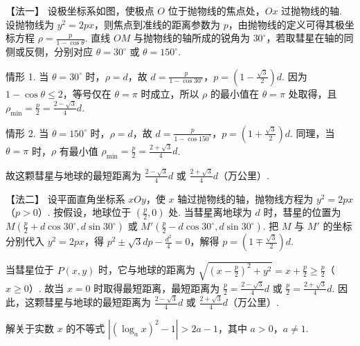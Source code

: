 \begin{solution}
【法一】 设极坐标系如图，使极点 \(O\) 位于抛物线的焦点处，\(Ox\) 过抛物线的轴. 设抛物线为 \(y^2=2px\)，则焦点到准线的距离参数为 \(p\)，由抛物线的定义可得其极坐标方程 \(\rho=\frac{p}{1-\cos\theta}\). 直线 \(OM\) 与抛物线的轴所成的锐角为 \(30^{\circ}\)，若取彗星在轴的同侧或反侧，分别对应 \(\theta=30^{\circ}\) 或 \(\theta=150^{\circ}\).

情形 1. 当 \(\theta = 30^{\circ}\) 时，\(\rho = d\)，故 \(d = \frac{p}{1 - \cos 30^{\circ}}\)，\(p = \left(1 - \frac{\sqrt{3}}{2}\right)d\). 因为 \(1-\cos\theta\leqslant2\)，等号仅在 \(\theta=\pi\) 时成立，所以 \(\rho\) 的最小值在 \(\theta=\pi\) 处取得，且
\(\rho_{\min} = \frac{p}{2} = \frac{2 - \sqrt{3}}{4}d\).

情形 2. 当 \(\theta = 150^{\circ}\) 时，\(\rho = d\)，故 \(d = \frac{p}{1 - \cos 150^{\circ}}\)，\(p = \left(1 + \frac{\sqrt{3}}{2}\right)d\). 同理，当 \(\theta = \pi\) 时，\(\rho\) 有最小值
\(\rho_{\min} = \frac{p}{2} = \frac{2 + \sqrt{3}}{4}d\).

故这颗彗星与地球的最短距离为 \(\frac{2 - \sqrt{3}}{4}d\) 或 \(\frac{2 + \sqrt{3}}{4}d\)（万公里）.

【法二】 设平面直角坐标系 \(xOy\)，使 \(x\) 轴过抛物线的轴，抛物线方程为 \(y^2 = 2px\)（\(p > 0\)）. 按假设，地球位于 \(\left(\frac{p}{2},0\right)\) 处. 当彗星离地球为 \(d\) 时，彗星的位置为 \(M\left(\frac{p}{2} + d\cos 30^{\circ}, d\sin 30^{\circ}\right)\) 或 \(M'\left(\frac{p}{2} - d\cos 30^{\circ}, d\sin 30^{\circ}\right)\). 把 \(M\) 与 \(M'\) 的坐标分别代入 \(y^2 = 2px\)，得 \(p^2 \pm \sqrt{3}dp - \frac{d^2}{4} = 0\)，解得 \(p = \left(1 \mp \frac{\sqrt{3}}{2}\right)d\).

当彗星位于 \(P(x,y)\) 时，它与地球的距离为 \(\sqrt{\left(x - \frac{p}{2}\right)^2 + y^2} = x + \frac{p}{2} \geqslant \frac{p}{2}\)（\(x \geqslant 0\)）. 故当 \(x = 0\) 时取得最短距离，最短距离为 \(\frac{p}{2} = \frac{2 - \sqrt{3}}{4}d\) 或 \(\frac{p}{2} = \frac{2 + \sqrt{3}}{4}d\). 因此，这颗彗星与地球的最短距离为 \(\frac{2 - \sqrt{3}}{4}d\) 或 \(\frac{2 + \sqrt{3}}{4}d\)（万公里）.
\end{solution}

\begin{problem}
解关于实数 \(x\) 的不等式 \(\left|(\log_a x)^2 - 1\right| > 2a - 1\)，其中 \(a > 0\)，\(a \neq 1\).
\end{problem}

